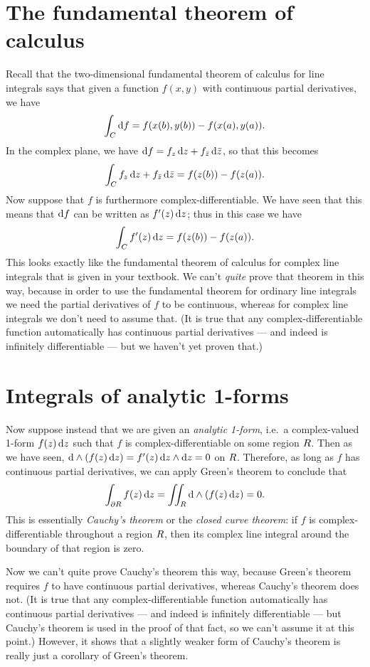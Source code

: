 \documentclass[12pt]{amsart}
\begin{document}
\section{The fundamental theorem of calculus}
\label{sec:complex-ftc}

Recall that the two-dimensional fundamental theorem of calculus for line integrals says that given a function $f(x,y)$ with continuous partial derivatives, we have
\[ \int_{C} {\mathrm{d} f} = f(x(b),y(b)) - f(x(a),y(a)). \]
In the complex plane, we have ${\mathrm{d} f} = {f}_{z} \,{\mathrm{d} z} + {f}_{\bar{z}} \,{\mathrm{d} \bar{z}}$, so that this becomes
\[ \int_{C} {f}_{z} \,{\mathrm{d} z} + {f}_{\bar{z}} \,{\mathrm{d} \bar{z}}  = f(z(b)) - f(z(a)). \]
Now suppose that $f$ is furthermore complex-differentiable.
We have seen that this means that ${\mathrm{d} f}$ can be written as $f'(z) \,{\mathrm{d} z}$; thus in this case we have
\[ \int_{C} f'(z)\,{\mathrm{d} z}  = f(z(b)) - f(z(a)). \]
This looks exactly like the fundamental theorem of calculus for complex line integrals that is given in your textbook.
We can't \emph{quite} prove that theorem in this way, because in order to use the fundamental theorem for ordinary line integrals we need the partial derivatives of $f$ to be continuous, whereas for complex line integrals we don't need to assume that.
(It is true that any complex-differentiable function automatically has continuous partial derivatives --- and indeed is infinitely differentiable --- but we haven't yet proven that.)

\section{Integrals of analytic 1-forms}
\label{sec:integrals-of-analytic-1forms}

Now suppose instead that we are given an \emph{analytic 1-form}, i.e.\ a complex-valued 1-form $f(z) \,{\mathrm{d} z}$ such that $f$ is complex-differentiable on some region $R$.
Then as we have seen, $\mathrm{d}\wedge(f(z)\,{\mathrm{d} z}) = f'(z)\,{\mathrm{d} z} \wedge{\ensuremath{\mathrm{d} z}} = 0$ on $R$.
Therefore, as long as $f$ has continuous partial derivatives, we can apply Green's theorem to conclude that
\[ \int_{\partial R} f(z)\,{\mathrm{d} z} = \iint_{R} \mathrm{d}\wedge(f(z)\,{\mathrm{d} z}) = 0. \]
This is essentially \emph{Cauchy's theorem} or the \emph{closed curve theorem}: if $f$ is complex-differentiable throughout a region $R$, then its complex line integral around the boundary of that region is zero.

Now we can't quite prove Cauchy's theorem this way, because Green's theorem requires $f$ to have continuous partial derivatives, whereas Cauchy's theorem does not.
(It is true that any complex-differentiable function automatically has continuous partial derivatives --- and indeed is infinitely differentiable --- but Cauchy's theorem is used in the proof of that fact, so we can't assume it at this point.)
However, it shows that a slightly weaker form of Cauchy's theorem is really just a corollary of Green's theorem.
\end{document}

